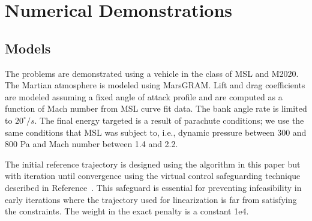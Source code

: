 \documentclass[letterpaper, preprint, paper,11pt]{AAS}	%
\begin{document}
	
	
	
	
	
	
	
	
	\section{Numerical Demonstrations}
	\subsection{Models}
	The problems are demonstrated using a vehicle in the class of MSL and M2020. The Martian atmosphere is modeled using MarsGRAM.\cite{MarsGRAM2010,MarsGRAM2010User} Lift and drag coefficients are modeled assuming a fixed angle of attack profile and are computed as a function of Mach number from MSL curve fit data. The bank angle rate is limited to $20^{\circ}/s$. The final energy targeted is a result of parachute conditions; we use the same conditions that MSL was subject to, i.e., dynamic pressure between 300 and 800 Pa and Mach number between 1.4 and 2.2. 
	
	The initial reference trajectory is designed using the algorithm in this paper but with iteration until convergence using the virtual control safeguarding technique described in Reference~. This safeguard is essential for preventing infeasibility in early iterations where the trajectory used for linearization is far from satisfying the constraints. The weight in the exact penalty is a constant 1e4.
	
\end{document}
